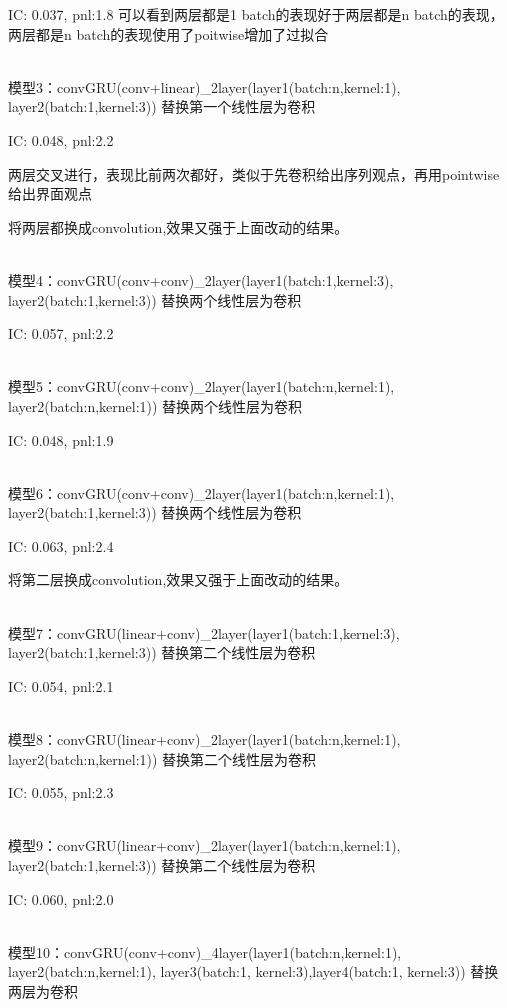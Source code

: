 \documentclass[11pt]{ctexart}
\begin{document}
{\kaishu \small IC: 0.037, pnl:1.8}
可以看到两层都是1 batch的表现好于两层都是n batch的表现，两层都是n batch的表现使用了poitwise增加了过拟合

~\\
模型3：convGRU(conv+linear)\_2layer(layer1(batch:n,kernel:1), layer2(batch:1,kernel:3)) 替换第一个线性层为卷积

{\kaishu \small IC: 0.048, pnl:2.2}

两层交叉进行，表现比前两次都好，类似于先卷积给出序列观点，再用pointwise给出界面观点

将两层都换成convolution,效果又强于上面改动的结果。

~\\
模型4：convGRU(conv+conv)\_2layer(layer1(batch:1,kernel:3), layer2(batch:1,kernel:3)) 替换两个线性层为卷积

{\kaishu \small IC: 0.057, pnl:2.2}

~\\
模型5：convGRU(conv+conv)\_2layer(layer1(batch:n,kernel:1), layer2(batch:n,kernel:1)) 替换两个线性层为卷积

{\kaishu \small IC: 0.048, pnl:1.9}

~\\
模型6：convGRU(conv+conv)\_2layer(layer1(batch:n,kernel:1), layer2(batch:1,kernel:3)) 替换两个线性层为卷积

{\kaishu \small IC: 0.063, pnl:2.4}

将第二层换成convolution,效果又强于上面改动的结果。

~\\
模型7：convGRU(linear+conv)\_2layer(layer1(batch:1,kernel:3), layer2(batch:1,kernel:3)) 替换第二个线性层为卷积

{\kaishu \small IC: 0.054, pnl:2.1}

~\\
模型8：convGRU(linear+conv)\_2layer(layer1(batch:n,kernel:1), layer2(batch:n,kernel:1)) 替换第二个线性层为卷积

{\kaishu \small IC: 0.055, pnl:2.3}

~\\
模型9：convGRU(linear+conv)\_2layer(layer1(batch:n,kernel:1), layer2(batch:1,kernel:3)) 替换第二个线性层为卷积

{\kaishu \small IC: 0.060, pnl:2.0}

~\\
模型10：convGRU(conv+conv)\_4layer(layer1(batch:n,kernel:1), layer2(batch:n,kernel:1), layer3(batch:1, kernel:3),layer4(batch:1, kernel:3)) 替换两层为卷积
\end{document}

